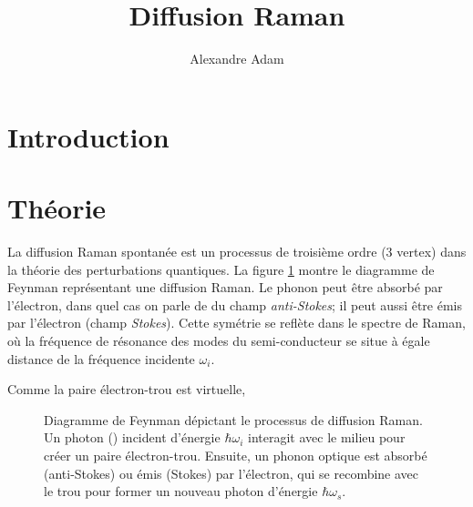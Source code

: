 \documentclass[10pt,letterpaper,twocolumn]{article}
\title{\vspace{-10mm}\Large
Diffusion Raman %
\vspace{-4mm}}
\author{\large
Alexandre Adam
}
\date{\vspace{-8mm}}
\begin{document}
\twocolumn[
\maketitle
\begin{onecolabstract} %

\vspace{4mm} %
\end{onecolabstract}
]

\section{Introduction}\label{intro} %


\section{Théorie}\label{sec:theorie} %
La diffusion Raman spontanée est un processus de troisième ordre (3 vertex) dans la théorie des perturbations quantiques. La figure \ref{fig:FeynmanD} montre le diagramme de Feynman représentant une diffusion Raman. Le phonon peut être absorbé par l'électron, dans quel cas on parle de du champ \textit{anti-Stokes}; il peut aussi être émis par l'électron (champ \textit{Stokes}). Cette symétrie se reflète dans le spectre de Raman, où la fréquence de résonance des modes du semi-conducteur se situe à égale distance de la fréquence incidente $\omega_i$. \par
Comme la paire électron-trou est virtuelle, \cite{Yu2010}

\begin{figure}[H]
	\centering
	\caption{Diagramme de Feynman dépictant le processus de diffusion Raman. Un photon (\leadsto) incident d'énergie $\hbar \omega_i$ interagit avec le milieu pour créer un paire électron-trou. Ensuite, un phonon optique est absorbé (anti-Stokes) ou émis (Stokes) par l'électron, qui se recombine avec le trou pour former un nouveau photon d'énergie $\hbar \omega_s$. }
	\label{fig:FeynmanD}
\end{figure}
\end{document}
